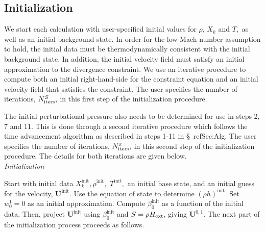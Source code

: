 \documentclass[11pt]{article}
\newcommand{\Hext}{{H_{\rm ext}}}
\newcommand{\initp}{\mathrm{init}}
\newcommand{\ubold}{\mathbf{U}}
\begin{document}
\subsection{Initialization}\label{Sec:Initialization}

We start each calculation with user-specified initial values for
$\rho$, $X_k$ and $T,$ as well as an initial background state.  In
order for the low Mach number assumption to hold, the initial data
must be thermodynamically consistent with the initial background
state.  In addition, the initial velocity field must satisfy an
initial approximation to the divergence constraint.  We use an iterative
procedure to compute both an initial right-hand-side for the
constraint equation and an initial velocity field that satisfies
the constraint.  The user specifies the number of iterations,
$N_{\rm iters}^{S},$ in this first step of the initialization procedure.

The initial perturbational pressure also needs to be determined for
use in steps 2, 7 and 11. 
This is done through a second iterative procedure which follows the
time advancement algorithm as described in steps 1-11 in \S~ref{Sec:Alg}.  
The user specifies the number of iterations, 
$N_{\rm iters}^{\pi},$ in this second step of the initialization procedure.
The details for both iterations are given below.\\

 {\em Initialization}

Start with initial data $X_k^{\initp}, \rho^{\initp},$ $T^{\initp},$ an 
initial base state, and an initial guess for the velocity, $\ubold^{\initp}.$
Use the equation of state to determine $(\rho h)^{\initp}$.  Set
$w_0^1 = 0$ as an initial approximation.  Compute $\beta_0^{\initp}$ as a function of 
the initial data.  Then, project $\ubold^{\initp}$ using $\beta_0^{\initp}$ and 
$S = \rho\Hext$, giving $\ubold^{0,1}$.  The next part of the initialization process 
proceeds as follows.
\end{document}
